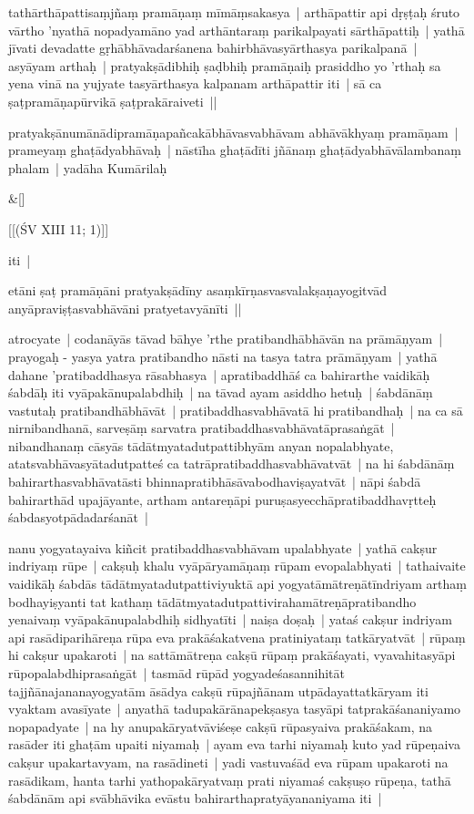 \documentclass[article,12pt,a4paper]{memoir}
\begin{document}
	  \pstart tathārthāpattisaṃjñaṃ pramāṇaṃ mīmāṃsakasya | arthāpattir api dṛṣṭaḥ śruto vārtho 'nyathā nopadyamāno yad arthāntaraṃ parikalpayati sārthāpattiḥ | yathā jīvati devadatte gṛhābhāvadarśanena bahirbhāvasyārthasya parikalpanā | asyāyam arthaḥ | pratyakṣādibhiḥ ṣaḍbhiḥ pramāṇaiḥ prasiddho yo 'rthaḥ sa yena vinā na yujyate tasyārthasya kalpanam arthāpattir iti | sā ca ṣaṭpramāṇapūrvikā ṣaṭprakāraiveti ||
	\pend
      

	  \pstart pratyakṣānumānādipramāṇapañcakābhāvasvabhāvam abhāvākhyaṃ pramāṇam | prameyaṃ ghaṭādyabhāvaḥ | nāstīha ghaṭādīti jñānaṃ ghaṭādyabhāvālambanaṃ phalam | yadāha Kumārilaḥ
	\pend
      
	    
	    \stanza[\smallbreak]
	\&[\smallbreak]


	[[(ŚV XIII 11; 1)]]

	  \pstart iti | 
	\pend
      

	  \pstart etāni ṣaṭ pramāṇāni pratyakṣādīny asaṃkīrṇasvasvalakṣaṇayogitvād anyāpraviṣṭasvabhāvāni pratyetavyānīti ||
	\pend
      

	  \pstart atrocyate | codanāyās tāvad bāhye 'rthe pratibandhābhāvān na prāmāṇyam | prayogaḥ - yasya yatra pratibandho nāsti na tasya tatra prāmāṇyam | yathā dahane 'pratibaddhasya rāsabhasya | apratibaddhāś ca bahirarthe vaidikāḥ śabdāḥ iti vyāpakānupalabdhiḥ | na tāvad ayam asiddho hetuḥ | śabdānāṃ vastutaḥ pratibandhābhāvāt | pratibaddhasvabhāvatā hi pratibandhaḥ | na ca sā nirnibandhanā, sarveṣāṃ sarvatra pratibaddhasvabhāvatāprasaṅgāt | nibandhanaṃ cāsyās tādātmyatadutpattibhyām anyan nopalabhyate, atatsvabhāvasyātadutpatteś ca tatrāpratibaddhasvabhāvatvāt | na hi śabdānāṃ bahirarthasvabhāvatāsti bhinnapratibhāsāvabodhaviṣayatvāt | nāpi śabdā bahirarthād upajāyante, artham antareṇāpi puruṣasyecchāpratibaddhavṛtteḥ śabdasyotpādadarśanāt |
	\pend
      

	  \pstart nanu yogyatayaiva kiñcit pratibaddhasvabhāvam upalabhyate | yathā cakṣur indriyaṃ rūpe | cakṣuḥ khalu vyāpāryamāṇaṃ rūpam evopalabhyati | tathaivaite vaidikāḥ śabdās tādātmyatadutpattiviyuktā api yogyatāmātreṇātīndriyam arthaṃ bodhayiṣyanti tat kathaṃ tādātmyatadutpattivirahamātreṇāpratibandho yenaivaṃ vyāpakānupalabdhiḥ sidhyatīti | naiṣa doṣaḥ | yataś cakṣur indriyam api rasādiparihāreṇa rūpa eva prakāśakatvena pratiniyataṃ tatkāryatvāt | rūpaṃ hi cakṣur upakaroti | na sattāmātreṇa cakṣū rūpaṃ prakāśayati, vyavahitasyāpi rūpopalabdhiprasaṅgāt | tasmād rūpād yogyadeśasannihitāt tajjñānajananayogyatām āsādya cakṣū rūpajñānam utpādayattatkāryam iti vyaktam avasīyate | anyathā tadupakārānapekṣasya tasyāpi tatprakāśananiyamo nopapadyate | na hy anupakāryatvāviśeṣe cakṣū rūpasyaiva prakāśakam, na rasāder iti ghaṭām upaiti niyamaḥ | ayam eva tarhi niyamaḥ kuto yad rūpeṇaiva cakṣur upakartavyam, na rasādineti | yadi vastuvaśād eva rūpam upakaroti na rasādikam, hanta tarhi yathopakāryatvaṃ prati niyamaś cakṣuṣo rūpeṇa, tathā śabdānām api svābhāvika evāstu bahirarthapratyāyananiyama iti |
	\pend
      
\end{document}
